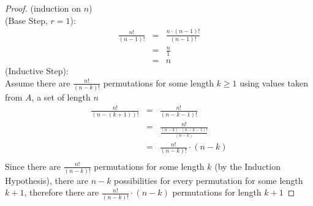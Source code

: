 \documentclass{article}
\begin{document}
\begin{enumerate}
    \begin{proof}
        (induction on $n$) \\
        (Base Step, $r=1$):
        \begin{eqnarray}
            \frac{n!}{(n-1)!} &=& \frac{n \cdot (n-1)!}{(n-1)!} \\
            &=& \frac{n}{1} \\
            &=& n
        \end{eqnarray}
        (Inductive Step): \\
        Assume there are $\frac{n!}{(n-k)!}$ permutations for some length $k \geq 1$ using values taken from $A$, a set of length $n$
        \begin{eqnarray}
            \frac{n!}{(n-(k+1))!} &=& \frac{n!}{(n-k-1)!} \\
            &=& \frac{n!}{\frac{(n-k) \cdot (n-k-1)!}{(n-k)}} \\
            &=& \frac{n!}{(n-k)!} \cdot (n-k) \\
        \end{eqnarray}
        Since there are $\frac{n!}{(n-k)!}$ permutations for some length $k$ (by the Induction Hypothesis), there are $n-k$ possibilities for every permutation for some length $k+1$, therefore there are $\frac{n!}{(n-k)!} \cdot (n-k)$ permutations for length $k+1$
    \end{proof}
\end{enumerate}
\end{document}
